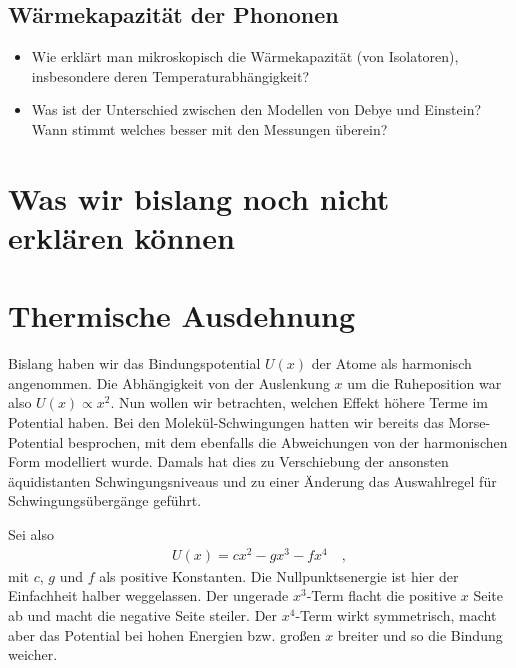 \subsection*{Wärmekapazität der Phononen}

\begin{itemize}\setlength{\itemsep}{0pt}
    \item Wie erklärt man mikroskopisch die Wärmekapazität (von Isolatoren), insbesondere deren Temperaturabhängigkeit?
    \item Was ist der Unterschied zwischen den Modellen von Debye und Einstein? Wann stimmt welches besser mit den Messungen überein? 
\end{itemize}



\section{Was wir bislang noch nicht erklären können}



\section{Thermische Ausdehnung}

Bislang haben wir das Bindungspotential $U(x)$ der Atome als harmonisch angenommen. Die Abhängigkeit von der Auslenkung $x$ um die Ruheposition war also $U(x) \propto x^2$. Nun wollen wir betrachten, welchen Effekt höhere Terme im Potential haben. Bei den Molekül-Schwingungen hatten wir bereits das Morse-Potential besprochen, mit dem ebenfalls die Abweichungen von der harmonischen Form modelliert wurde. Damals hat dies zu Verschiebung der ansonsten äquidistanten Schwingungsniveaus und zu einer Änderung das Auswahlregel für Schwingungsübergänge geführt.

Sei also 
\begin{eqnarray}
    U(x) = c x^2 - g x^3 - f x^4 \quad ,
\end{eqnarray}
mit $c$, $g$ und $f$ als positive Konstanten. Die Nullpunktsenergie ist hier der Einfachheit halber weggelassen. Der ungerade $x^3$-Term flacht die positive $x$ Seite ab und macht die negative Seite steiler. Der $x^4$-Term wirkt symmetrisch, macht aber das Potential bei hohen Energien bzw. großen $x$  breiter und so die Bindung weicher.

